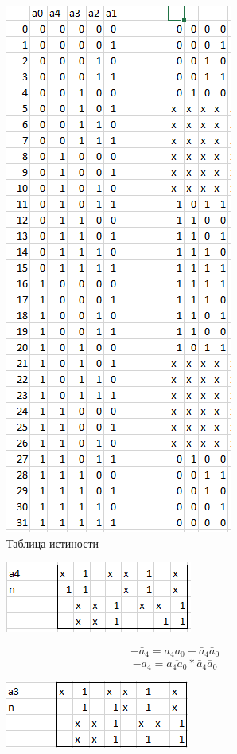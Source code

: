\documentclass[a4paper,14pt]{article}
\begin{document}
\begin{figure}[H]
	\centering
	\includegraphics[width=0.4\linewidth]{images/preobr_ist}
	\caption{Таблица истиности}
	\label{fig:preobr_ist}
\end{figure}


\begin{figure}[H]
	\centering
	\includegraphics[width=0.5\linewidth]{images2/preobr_001}
	\caption{}
	\label{fig:preobr001}
\end{figure}


$$-\bar{a}_4 = a_4 a_0 + \bar{a}_4\bar{a}_0$$
$$-a_4 = \overline{a_4 a_0} * \overline{\bar{a}_4\bar{a}_0}$$


\begin{figure}[H]
	\centering
	\includegraphics[width=0.5\linewidth]{images2/preobr_002}
	\caption{}
	\label{fig:preobr002}
\end{figure}
\end{document}

